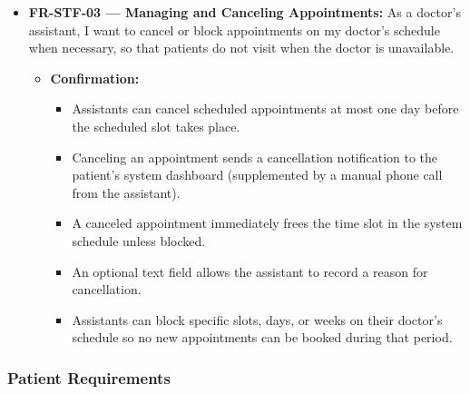 \documentclass[11pt,a4paper]{article}
\begin{document}
\begin{itemize}
    \item \textbf{FR-STF-03 — Managing and Canceling Appointments:} As a doctor's assistant, I want to cancel or block appointments on my doctor's schedule when necessary, so that patients do not visit when the doctor is unavailable.
    \begin{itemize}
        \item \textbf{Confirmation:}
        \begin{itemize}
            \item Assistants can cancel scheduled appointments at most one day before the scheduled slot takes place.
            \item Canceling an appointment sends a cancellation notification to the patient's system dashboard (supplemented by a manual phone call from the assistant).
            \item A canceled appointment immediately frees the time slot in the system schedule unless blocked.
            \item An optional text field allows the assistant to record a reason for cancellation.
            \item Assistants can block specific slots, days, or weeks on their doctor's schedule so no new appointments can be booked during that period.
        \end{itemize}
    \end{itemize}
\end{itemize}

\subsubsection{Patient Requirements}
\end{document}
